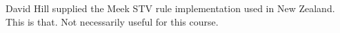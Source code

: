 David Hill supplied the Meek STV rule implementation used in New Zealand.  This is that.  Not necessarily useful for this course.
